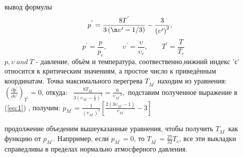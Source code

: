 \begin{frame}{вывод формулы}
\begin{equation}
p^{'}=\frac{8T^{'}}{3\left(\n\upsilon'-1/3\right)}-\frac{3}{\left(\upsilon'\right)^2},
\label{eq:1}
\end{equation}
\[ \quad   p^{'}=\frac{p}{p_{c}},\ \quad \quad \upsilon^{'}=\frac{\upsilon}{\upsilon_{c}},\quad \quad T^{'}=\frac{T}{T_{c}}\]
\(p,\upsilon \ and \ T\) - давление, объём и температура, соотвественно,нижний индекс 'с' относится к критическим значениям, а простое число к приведённым координатам. Точка максимального перегрева \(T_{M^{'}}\) находим из уравнения: 
\vspace{0.25cm}\({\left(\frac{\partial p^{'}}{\partial \upsilon^{'}}\right)}_{T^{'}}=0\), откуда: \ \(\frac{8T_{M^{'}}}{3{\left(\upsilon_{M^{'}}-\frac{1}{3}\right)}^{2}}=\frac{6}{{\upsilon_{M^{'}}}^{3}}\),\  подставим полученное
\vspace{0.25cm}
выражение в (\ref{eq:1}) , получим: \(p_{M^{'}}=\frac{1}{\left({\upsilon_{M^{'}}}\right)^{2}}\left[\frac{2\left(3{\upsilon_{M^{'}}-1}\right)}{{\upsilon_{M^{'}}}}-3\right]\)
\end{frame}
\begin{frame}{продолжение}
 объеденим вышеуказанные уравнения, чтобы получить \(T_{M^{'}}\) как функцию от \(p_{M^{'}}\). Напрример, если \(p_{M^{'}}=0\), то \(T_{M^{'}}=\frac{27}{32}T_{c}\), все эти выкладки справедливы в пределах нормально атмосферного давления.
\end{frame}
